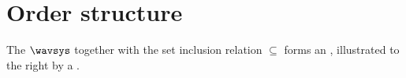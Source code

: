 


\section{Order structure}

\begin{minipage}{\tw-70mm}\raggedright
The  $\wavsys$  together with the 
set inclusion relation $\subseteq$ 
forms an , 
illustrated to the right by a .%
\end{minipage}%
\hfill{}%


